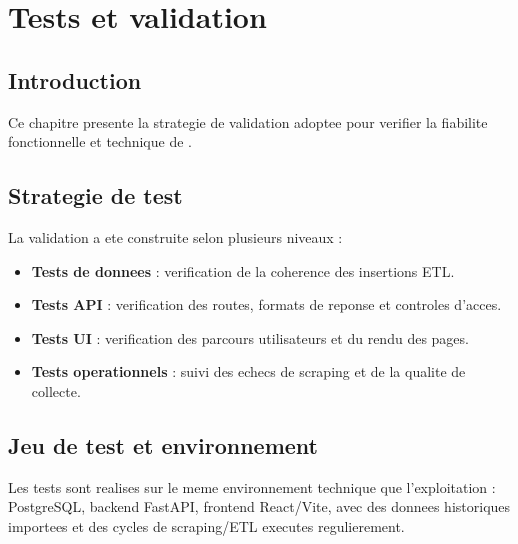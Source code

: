 \chapter{Tests et validation}

\section{Introduction}
Ce chapitre presente la strategie de validation adoptee pour verifier la fiabilite fonctionnelle et technique de \ProjectName{}.

\section{Strategie de test}
La validation a ete construite selon plusieurs niveaux :
\begin{itemize}[leftmargin=1.2cm]
	\item \textbf{Tests de donnees} : verification de la coherence des insertions ETL.
	\item \textbf{Tests API} : verification des routes, formats de reponse et controles d'acces.
	\item \textbf{Tests UI} : verification des parcours utilisateurs et du rendu des pages.
	\item \textbf{Tests operationnels} : suivi des echecs de scraping et de la qualite de collecte.
\end{itemize}

\section{Jeu de test et environnement}
Les tests sont realises sur le meme environnement technique que l'exploitation : PostgreSQL, backend FastAPI, frontend React/Vite, avec des donnees historiques importees et des cycles de scraping/ETL executes regulierement.


